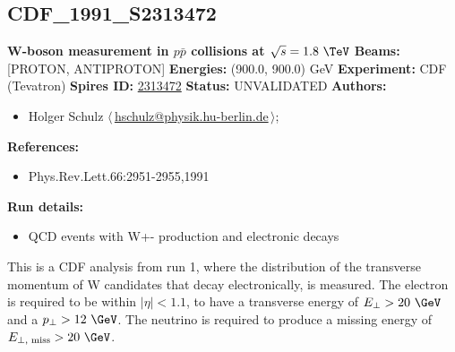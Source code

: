 \subsection[CDF\_1991\_S2313472]{CDF\_1991\_S2313472\,\cite{Abe:1991rk}}
\textbf{W-boson \pT measurement in $p\bar{p}$ collisions at $\sqrt{s}=1.8~\TeV$}\newline
\textbf{Beams:} [PROTON, ANTIPROTON] \newline
\textbf{Energies:} (900.0, 900.0) GeV \newline
\textbf{Experiment:} CDF (Tevatron) \newline
\textbf{Spires ID:} \href{http://www.slac.stanford.edu/spires/find/hep/www?rawcmd=key+2313472}{2313472}\newline
\textbf{Status:} UNVALIDATED\newline
\textbf{Authors:}
\begin{itemize}
  \item Holger Schulz $\langle\,$\href{mailto:hschulz@physik.hu-berlin.de}{hschulz@physik.hu-berlin.de}$\,\rangle$;
\end{itemize}
\textbf{References:}
\begin{itemize}
  \item Phys.Rev.Lett.66:2951-2955,1991
\end{itemize}
\textbf{Run details:}
\begin{itemize}

  \item QCD events with W+- production and electronic decays\end{itemize}

\noindent This is a CDF analysis from run 1, where the distribution of the transverse momentum of W candidates that decay  electronically, is measured. The electron is required to be within $\left|\eta\right| < 1.1$, to have a transverse energy of $E_\perp > 20~\GeV$ and a $p_\perp > 12~\GeV$. The neutrino is required to produce a missing energy of $E_{\perp, \text{ miss}}>20~\GeV$.

\clearpage


\clearpage

